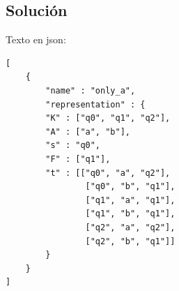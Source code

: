 \documentclass[12pt]{article}
\begin{document}
\subsection*{Solución}
Texto en json: 
\begin{verbatim}
[
    {
        "name" : "only_a",
        "representation" : {
        "K" : ["q0", "q1", "q2"],
        "A" : ["a", "b"],
        "s" : "q0",
        "F" : ["q1"],
        "t" : [["q0", "a", "q2"],
                ["q0", "b", "q1"],
                ["q1", "a", "q1"],
                ["q1", "b", "q1"],
                ["q2", "a", "q2"],
                ["q2", "b", "q1"]]
        }
    }
]
\end{verbatim}
\end{document}
